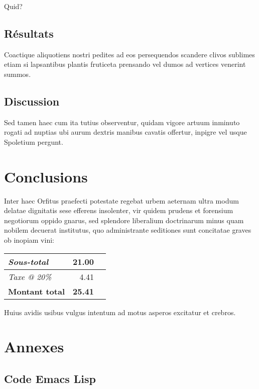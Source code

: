 \documentclass[french]{report}
\begin{document}
Quid?

\chapter{Résultats}
\label{sec:orgfc3705e}

Coactique aliquotiens nostri pedites ad eos persequendos scandere clivos
sublimes etiam si lapsantibus plantis fruticeta prensando vel dumos ad vertices
venerint summos.

\chapter{Discussion}
\label{sec:org997557c}

Sed tamen haec cum ita tutius observentur, quidam vigore artuum inminuto rogati
ad nuptias ubi aurum dextris manibus cavatis offertur, inpigre vel usque
Spoletium pergunt.

\part{Conclusions}
\label{sec:orga54d678}

Inter haec Orfitus praefecti potestate regebat urbem aeternam ultra modum
delatae dignitatis sese efferens insolenter, vir quidem prudens et forensium
negotiorum oppido gnarus, sed splendore liberalium doctrinarum minus quam
nobilem decuerat institutus, quo administrante seditiones sunt concitatae graves
ob inopiam vini:

\begin{center}
\begin{tabular}{lrl}
\emph{Sous-total} & 21.00 & \texteuro{}\\
\hline
\emph{Taxe @ 20\%} & 4.41 & \texteuro{}\\
\hline
\textbf{Montant total} & \textbf{\large 25.41} & \textbf{\texteuro{}}\\
\end{tabular}
\end{center}

Huius avidis usibus vulgus intentum ad motus asperos excitatur et crebros.

\part{Annexes}
\label{sec:orgf9f1e88}

\chapter{Code Emacs Lisp}
\label{sec:org93a5709}
\end{document}
